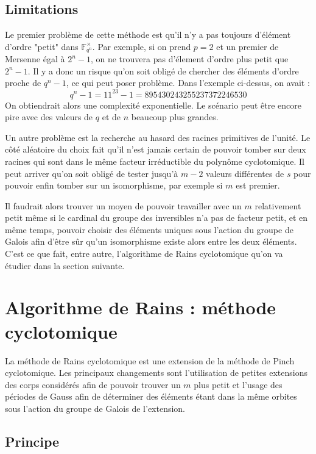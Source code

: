 \documentclass[a4paper]{article} %
\numberwithin{section}{part}
\numberwithin{equation}{section}
\newcommand\GF[1]{\mathbb{F}_{#1}}
\begin{document}
\subsection{Limitations}
Le premier problème de cette méthode est qu'il n'y a pas toujours d'élément
d'ordre "petit" dans $\GF{q^n}^{\times}$. Par exemple, si on prend $p = 2$ et un
premier de Mersenne égal à $2^n - 1$, on ne trouvera pas d'élement d'ordre plus
petit que $2^n - 1$. Il y a donc un risque qu'on soit obligé de chercher des
éléments d'ordre proche de $q^n - 1$, ce qui peut poser problème. Dans l'exemple
ci-dessus, on avait :
\[q^n - 1 = 11^{23} - 1 = 895430243255237372246530\]
On obtiendrait alors une complexité exponentielle. Le scénario peut être encore 
pire avec des valeurs de $q$ et de $n$ beaucoup plus grandes.\par
Un autre problème est la recherche au hasard des racines primitives de l'unité. 
Le côté aléatoire du choix fait qu'il n'est jamais certain de pouvoir tomber sur
deux racines qui sont dans le même facteur irréductible du polynôme
cyclotomique. Il peut arriver qu'on soit obligé de tester jusqu'à $m-2$ valeurs
différentes de $s$ pour pouvoir enfin tomber sur un isomorphisme, par exemple
si $m$ est premier.\par
Il faudrait alors trouver un moyen de pouvoir travailler avec un $m$
relativement petit même si le cardinal du groupe des inversibles n'a pas de
facteur petit, et en même temps, pouvoir choisir des éléments uniques sous
l'action du groupe de Galois afin d'être sûr qu'un isomorphisme existe alors
entre les deux éléments. C'est ce que fait, entre autre, l'algorithme de Rains 
cyclotomique qu'on va étudier dans la section suivante.


\section{Algorithme de Rains : méthode cyclotomique}
La méthode de Rains cyclotomique est une extension de la méthode de Pinch
cyclotomique. Les principaux changements sont l'utilisation de petites
extensions des corps considérés afin de pouvoir trouver un $m$ plus petit et
l'usage des périodes de Gauss afin de déterminer des éléments étant dans la même
orbites sous l'action du groupe de Galois de l'extension.

\subsection{Principe}
\end{document}

